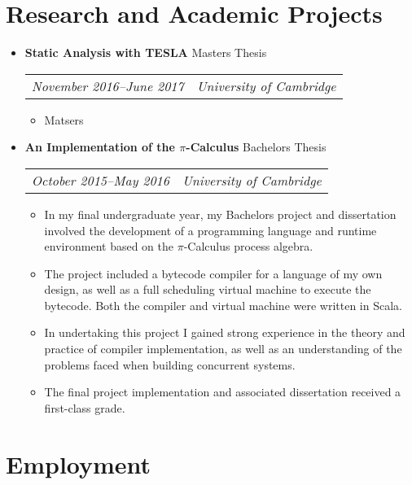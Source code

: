 \documentclass[letterpaper]{article}
\begin{document}
\section*{Research and Academic Projects}
  \begin{itemize}
    \item \textbf{Static Analysis with TESLA} Masters Thesis \\
      \begin{tabular}{c|c}
        \emph{November 2016--June 2017} & \emph{University of Cambridge}
      \end{tabular}
      \begin{itemize}
        \item Matsers
      \end{itemize}

    \item \textbf{An Implementation of the $\pi$-Calculus} Bachelors Thesis \\
        \begin{tabular}{c|c}
            \emph{October 2015--May 2016} & \emph{University of Cambridge}
        \end{tabular}
        \begin{itemize}
            \item In my final undergraduate year, my Bachelors project and
              dissertation involved the development of a programming language
              and runtime environment based on the $\pi$-Calculus process
              algebra.

            \item The project included a bytecode compiler for a language of my
              own design, as well as a full scheduling virtual machine to
              execute the bytecode. Both the compiler and virtual machine were
              written in Scala.

            \item In undertaking this project I gained strong experience in the
              theory and practice of compiler implementation, as well as an
              understanding of the problems faced when building concurrent
              systems.

            \item The final project implementation and associated dissertation
              received a first-class grade.
        \end{itemize}
  \end{itemize}
\section*{Employment}
\end{document}

